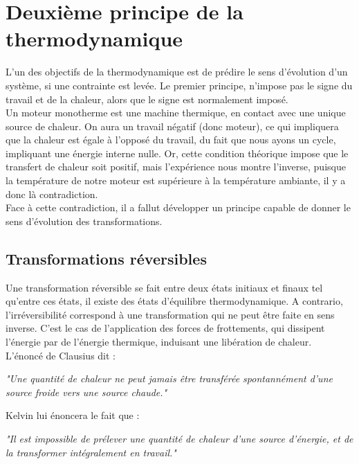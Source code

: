 \chapter{Deuxième principe de la thermodynamique}

L'un des objectifs de la thermodynamique est de prédire le sens d'évolution d'un système, si une contrainte est levée. Le premier principe, n'impose pas le signe du travail et de la chaleur, alors que le signe est normalement imposé.\\

Un moteur monotherme est une machine thermique, en contact avec une unique source de chaleur. On aura un travail négatif (donc moteur), ce qui impliquera que la chaleur est égale à l'opposé du travail, du fait que nous ayons un cycle, impliquant une énergie interne nulle. Or, cette condition théorique impose que le transfert de chaleur soit positif, mais l'expérience nous montre l'inverse, puisque la température de notre moteur est supérieure à la température ambiante, il y a donc là contradiction.\\

Face à cette contradiction, il a fallut développer un principe capable de donner le sens d'évolution des transformations.

\section{Transformations réversibles}

Une transformation réversible se fait entre deux états initiaux et finaux tel qu'entre ces états, il existe des états d'équilibre thermodynamique. A contrario, l'irréversibilité correspond à une transformation qui ne peut être faite en sens inverse. C'est le cas de l'application des forces de frottements, qui dissipent l'énergie par de l'énergie thermique, induisant une libération de chaleur.\\

L'énoncé de Clausius dit :

\begin {center}
\textit{"Une quantité de chaleur ne peut jamais être transférée spontannément d'une source froide vers une source chaude."}
\end{center}

Kelvin lui énoncera le fait que :
\begin{center}
\textit{"Il est impossible de prélever une quantité de chaleur d'une source d'énergie, et de la transformer intégralement en travail."}
\end{center}

